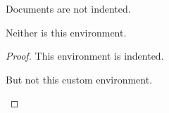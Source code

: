 \documentclass{article}
\begin{document}
Documents are not indented.

\begin{mydocument}

Neither is this environment.

\begin{proof}

This environment is indented.

\begin{myproof}

But not this custom environment.

\end{myproof}

\end{proof}

\end{mydocument}
\end{document}
